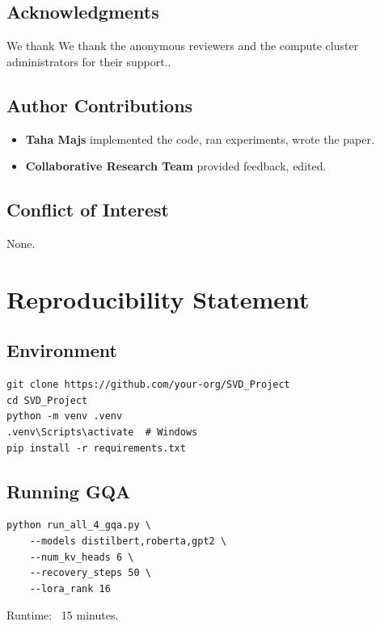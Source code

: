\subsection{Acknowledgments}

We thank We thank the anonymous reviewers and the compute cluster administrators for their support..

\subsection{Author Contributions}

\begin{itemize}
\item \textbf{Taha Majs} implemented the code, ran experiments, wrote the paper.
\item \textbf{Collaborative Research Team} provided feedback, edited.

\end{itemize}
\subsection{Conflict of Interest}

None.


\section{Reproducibility Statement}

\subsection{Environment}

\begin{lstlisting}
git clone https://github.com/your-org/SVD_Project
cd SVD_Project
python -m venv .venv
.venv\Scripts\activate  # Windows
pip install -r requirements.txt
\end{lstlisting}

\subsection{Running GQA}

\begin{lstlisting}
python run_all_4_gqa.py \
    --models distilbert,roberta,gpt2 \
    --num_kv_heads 6 \
    --recovery_steps 50 \
    --lora_rank 16
\end{lstlisting}

Runtime: ~15 minutes.

